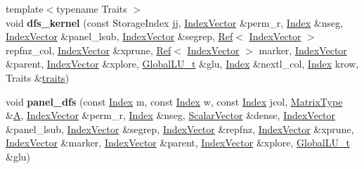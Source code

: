 \begin{DoxyCompactItemize}
\item 
\mbox{\label{group___sparse_l_u___module_ab6ab2defd7f6bfef91ff99b6b1e00880}} 
{\footnotesize template$<$typename Traits $>$ }\\void {\bfseries dfs\+\_\+kernel} (const Storage\+Index jj, \hyperlink{group___core___module}{Index\+Vector} \&perm\+\_\+r, \hyperlink{namespace_eigen_a62e77e0933482dafde8fe197d9a2cfde}{Index} \&nseg, \hyperlink{group___core___module}{Index\+Vector} \&panel\+\_\+lsub, \hyperlink{group___core___module}{Index\+Vector} \&segrep, \hyperlink{group___core___module_class_eigen_1_1_ref}{Ref}$<$ \hyperlink{group___core___module}{Index\+Vector} $>$ repfnz\+\_\+col, \hyperlink{group___core___module}{Index\+Vector} \&xprune, \hyperlink{group___core___module_class_eigen_1_1_ref}{Ref}$<$ \hyperlink{group___core___module}{Index\+Vector} $>$ marker, \hyperlink{group___core___module}{Index\+Vector} \&parent, \hyperlink{group___core___module}{Index\+Vector} \&xplore, \hyperlink{struct_eigen_1_1internal_1_1_l_u___global_l_u__t}{Global\+L\+U\+\_\+t} \&glu, \hyperlink{namespace_eigen_a62e77e0933482dafde8fe197d9a2cfde}{Index} \&nextl\+\_\+col, \hyperlink{namespace_eigen_a62e77e0933482dafde8fe197d9a2cfde}{Index} krow, Traits \&\hyperlink{struct_eigen_1_1internal_1_1traits}{traits})
\item 
\mbox{\label{group___sparse_l_u___module_a8c3121399bef169be65974ac20e9be7d}} 
void {\bfseries panel\+\_\+dfs} (const \hyperlink{namespace_eigen_a62e77e0933482dafde8fe197d9a2cfde}{Index} m, const \hyperlink{namespace_eigen_a62e77e0933482dafde8fe197d9a2cfde}{Index} w, const \hyperlink{namespace_eigen_a62e77e0933482dafde8fe197d9a2cfde}{Index} jcol, \hyperlink{group___sparse_core___module}{Matrix\+Type} \&\hyperlink{group___core___module_class_eigen_1_1_matrix}{A}, \hyperlink{group___core___module}{Index\+Vector} \&perm\+\_\+r, \hyperlink{namespace_eigen_a62e77e0933482dafde8fe197d9a2cfde}{Index} \&nseg, \hyperlink{group___core___module}{Scalar\+Vector} \&dense, \hyperlink{group___core___module}{Index\+Vector} \&panel\+\_\+lsub, \hyperlink{group___core___module}{Index\+Vector} \&segrep, \hyperlink{group___core___module}{Index\+Vector} \&repfnz, \hyperlink{group___core___module}{Index\+Vector} \&xprune, \hyperlink{group___core___module}{Index\+Vector} \&marker, \hyperlink{group___core___module}{Index\+Vector} \&parent, \hyperlink{group___core___module}{Index\+Vector} \&xplore, \hyperlink{struct_eigen_1_1internal_1_1_l_u___global_l_u__t}{Global\+L\+U\+\_\+t} \&glu)

\end{DoxyCompactItemize}
